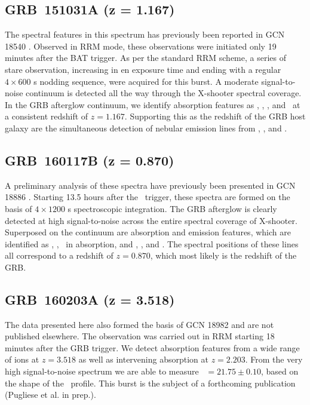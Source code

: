 \documentclass[longauth]{aa}    %
\begin{document}
\subsection{GRB~151031A (z = 1.167)}\label{151031}

The spectral features in this spectrum has previously been reported in GCN 18540
\citep{GCN18540}. Observed in RRM mode, these observations were initiated only
19 minutes after the BAT trigger. As per the standard RRM scheme, a series of
stare observation, increasing in en exposure time and ending with a regular $4
\times 600$ s nodding sequence, were acquired for this burst. A moderate
signal-to-noise continuum is detected all the way through the X-shooter spectral
coverage. In the GRB afterglow continuum, we identify absorption features as
\feii, \mgii, \mgi, and \caii~at a consistent redshift of $z = 1.167$.
Supporting this as the redshift of the GRB host galaxy are the simultaneous
detection of nebular emission lines from \oii, \hb, and \oiii.

\subsection{GRB~160117B (z = 0.870)}	\label{160117}

A preliminary analysis of these spectra have previously been presented in GCN
18886 \citep{GCN18886}. Starting 13.5 hours after the \swift~trigger, these
spectra are formed on the basis of $4 \times 1200$ s spectroscopic integration.
The GRB afterglow is clearly detected at high signal-to-noise across the entire
spectral coverage of X-shooter. Superposed on the continuum are absorption and
emission features, which are identified as \feii, \mgii, \mgi~in absorption, and
\oii, \hb, and \oiii. The spectral positions of these lines all correspond to a
redshift of $z = 0.870$, which most likely is the redshift of the GRB.

\subsection{GRB~160203A (z = 3.518)}\label{160203}

The data presented here also formed the basis of GCN 18982 \citep{GCN18982} and
are not published elsewhere. The observation was carried out in RRM starting 18
minutes after the GRB trigger. We detect absorption features from a wide range
of ions at $z=3.518$ as well as intervening absorption at $z=2.203$. From the
very high signal-to-noise spectrum we are able to measure \nh~$=21.75 \pm 0.10$,
based on the shape of the \lya~profile. This burst is the subject of a
forthcoming publication (Pugliese et al. in prep.).
\end{document}
